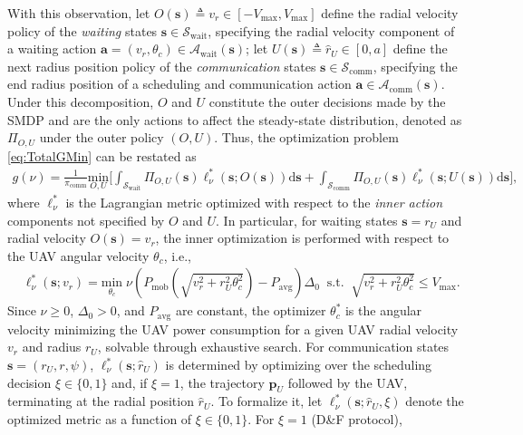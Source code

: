 \documentclass[12pt, draftcls, onecolumn]{IEEEtran}
\theoremstyle{plain}
\theoremstyle{definition}
\theoremstyle{remark}
\begin{document}
With this observation, let $O(\mathbf{s}){\triangleq}v_{r}{\in}[-V_{\mathrm{max}},V_{\mathrm{max}}]$ define the radial velocity policy of the \emph{waiting} states $\mathbf{s}{\in}\mathcal{S}_{\mathrm{wait}}$, specifying the radial velocity component of a waiting action $\mathbf{a}{=}(v_{r},\theta_{c}) \in \mathcal{A}_{\mathrm{wait}}(\mathbf{s})$; let $U(\mathbf{s}){\triangleq}\hat{r}_{U}{\in}[0,a]$ define the next radius position policy of the \emph{communication} states $\mathbf{s}{\in}\mathcal{S}_{\mathrm{comm}}$, specifying the end radius position of a scheduling and communication action $\mathbf{a}{\in}\mathcal{A}_{\mathrm{comm}}(\mathbf{s})$. Under this decomposition, $O$ and $U$ constitute the outer decisions made by the SMDP and are the only actions to affect the steady-state distribution, denoted as $\Pi_{O,U}$ under the outer policy $(O,U)$. Thus, the optimization problem \eqref{eq:TotalGMin} can be restated as
\begin{align}\label{eq:PolDecomp}
	g(\nu) = \frac{1}{\pi_{\mathrm{comm}}} \underset{O,U}{\mathrm{min}} \Bigr[ \int_{\mathcal{S}_{\mathrm{wait}}} \Pi_{O,U}(\mathbf{s}) \ell_{\nu}^{*}(\mathbf{s}; O(\mathbf{s}))\mathrm{d}\mathbf{s} + \int_{\mathcal{S}_{\mathrm{comm}}} \Pi_{O,U}(\mathbf{s}) \ell_{\nu}^{*}(\mathbf{s}; U(\mathbf{s})) \mathrm{d}\mathbf{s} \Bigr],
\end{align}
where $\ell_{\nu}^{*}$ is the Lagrangian metric optimized with respect to the \emph{inner action} components not specified by $O$ and $U$. In particular, for waiting states $\mathbf{s}{=}r_{U}$ and radial velocity $O(\mathbf{s}){=}v_{r}$, the inner optimization is performed with respect to the UAV angular velocity $\theta_{c}$, i.e.,
\begin{align}\label{eq:MinLWP}
	&\ell_{\nu}^{*}(\mathbf{s}; v_r) = \underset{\theta_c}{\mathrm{min}}\; \nu \left( P_{\mathrm{mob}}\left(\sqrt{v_{r}^2 + r_U^2\theta_c^2}\right) - P_{\mathrm{avg}} \right)\Delta_0 \;\; \mathrm{s.t.}\;\; \sqrt{v_{r}^{2} + r_U^2\theta_c^2} \leq V_{\mathrm{max}}.
\end{align}
Since $\nu{\geq}0$, $\Delta_{0}{>}0$, and $P_{\mathrm{avg}}$ are constant, the optimizer $\theta_{c}^{*}$ is the angular velocity minimizing the UAV power consumption for a given UAV radial velocity $v_{r}$ and radius $r_{U}$, solvable through exhaustive search. For communication states $\mathbf{s}{=}(r_{U},r,\psi)$, $\ell_{\nu}^{*}(\mathbf{s};\hat{r}_{U})$ is determined by optimizing over the scheduling decision $\xi{\in}\{0,1\}$ and, if $\xi{=}1$, the trajectory $\mathbf{p}_{U}$ followed by the UAV, terminating at the radial position $\hat{r}_{U}$. To formalize it, let $\ell_{\nu}^{*}(\mathbf{s};\hat{r}_{U},\xi)$ denote the optimized metric as a function of $\xi{\in}\{0,1\}$. For $\xi{=}1$ (D\&F protocol),
\end{document}
